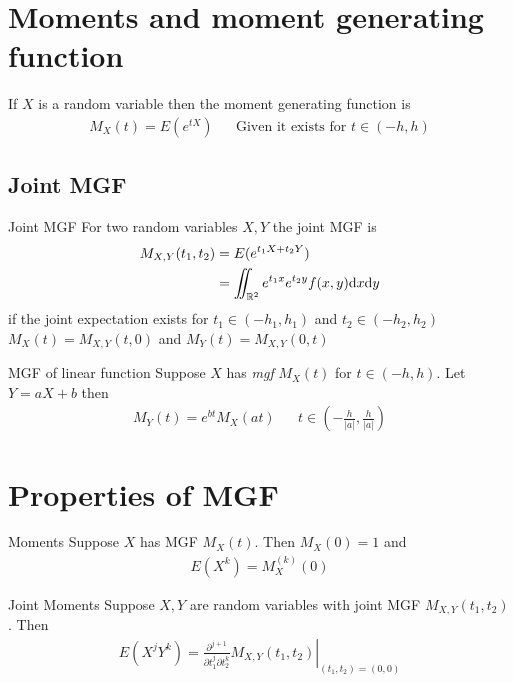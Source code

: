 \documentclass[16pt,a4paper]{article}
\begin{document}
\section{Moments and moment generating function}
\begin{defn}{}
    If $X$ is a random variable then the moment generating function is 
    \begin{align*}
        M_X(t) = E(e^{tX}) && \text{Given it exists for $t\in (-h, h)$}
    \end{align*} 
\end{defn}
\subsection{Joint MGF}
\begin{defn}{Joint MGF}
    For two random variables $X,Y$ the joint MGF is 
    \begin{align*}
        M_{X,Y}(t_1, t_2) &= E(e^{t_1X + t_2Y})\\
        &= \iint_{\mathbb{R}^2} e^{t_1x}e^{t_2y}f(x,y) \dd x \dd y
    \end{align*}
    if the joint expectation exists for $t_1 \in (-h_1, h_1)$ and $t_2\in (-h_2,h_2)$
    $M_X(t) = M_{X,Y}(t,0)$ and $M_Y(t) = M_{X,Y}(0,t)$
\end{defn}
\begin{thm}{MGF of linear function}
    Suppose $X$ has \textit{mgf} $M_X(t)$ for $t\in (-h, h)$. Let $Y = aX+b$ then 
    \begin{align*}
        M_Y(t) = e^{bt}M_X(at) && t \in \left(-\frac{h}{|a|}, \frac{h}{|a|}\right)
    \end{align*}
\end{thm}
\newpage
\section{Properties of MGF}
\begin{thm}{Moments}
    Suppose $X$ has MGF $M_X(t)$. Then $M_X(0) = 1$ and 
    \begin{align*}
        E(X^k) = M^{(k)}_X(0)
    \end{align*}
\end{thm}


\begin{thm}{Joint Moments}
    Suppose $X,Y$ are random variables with joint MGF $M_{X,Y}(t_1,t_2)$. Then 
    \begin{align*}
        E(X^jY^k) = \left.\frac{\partial^{j+1}}{\partial t_1^j \partial t_2^k} M_{X,Y}(t_1,t_2) \right|_{(t_1, t_2) = (0,0)}
    \end{align*}
\end{thm}
\end{document}

